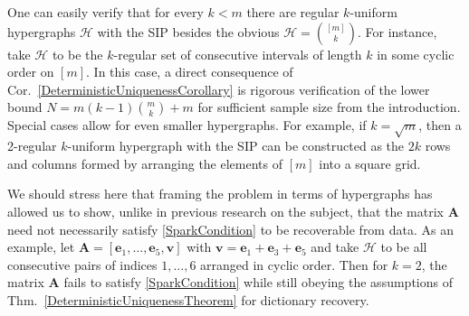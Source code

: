 \documentclass[journal, twocolumn]{IEEEtran}
\newtheorem{corollary}{Corollary}
\begin{document}


One can easily verify that for every $k < m$ there are regular $k$-uniform hypergraphs $\mathcal{H}$ with the SIP besides the obvious $\mathcal{H} = {[m] \choose k}$. For instance, take $\mathcal{H}$ to be the $k$-regular set of consecutive intervals of length $k$ in some cyclic order on $[m]$. In this case, a direct consequence of Cor.~\ref{DeterministicUniquenessCorollary} is rigorous verification of the lower bound \mbox{$N = m(k-1){m \choose k} + m$} for sufficient sample size from the introduction. Special cases allow for even smaller hypergraphs. For example, if $k = \sqrt{m}$, then a 2-regular $k$-uniform hypergraph with the SIP can be constructed as the $2k$ rows and columns formed by arranging the elements of $[m]$ into a square grid.

We should stress here that framing the problem in terms of hypergraphs has allowed us to show, unlike in previous research on the subject, that the matrix $\mathbf{A}$ need not necessarily satisfy \eqref{SparkCondition} to be recoverable from data. As an example, let $\mathbf{A} = [ \mathbf{e}_1, \ldots, \mathbf{e}_5, \mathbf{v}]$ with $\mathbf{v} = \mathbf{e}_1 + \mathbf{e}_3 + \mathbf{e}_5$ and take $\mathcal{H}$ to be all consecutive pairs of indices $1, \ldots ,6$ arranged in cyclic order. Then for $k=2$, the matrix $\mathbf{A}$ fails to satisfy \eqref{SparkCondition} while still obeying the assumptions of Thm.~\ref{DeterministicUniquenessTheorem} for dictionary recovery.%
\end{document}
